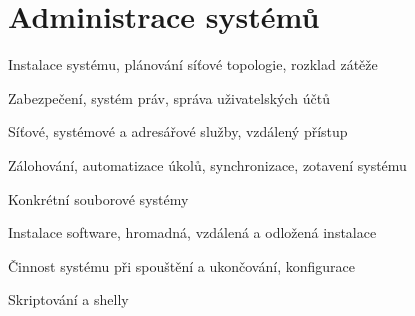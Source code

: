 \section{Administrace systémů}
\begin{pozadavky}
\begin{pitemize}
\item Instalace systému, plánování síťové topologie, rozklad zátěže
\item Zabezpečení, systém práv, správa uživatelských účtů
\item Síťové, systémové a adresářové služby, vzdálený přístup
\item Zálohování, automatizace úkolů, synchronizace, zotavení systému
\item Konkrétní souborové systémy
\item Instalace software, hromadná, vzdálená a odložená instalace
\item Činnost systému při spouštění a ukončování, konfigurace
\item Skriptování a shelly
\end{pitemize}
\end{pozadavky}










